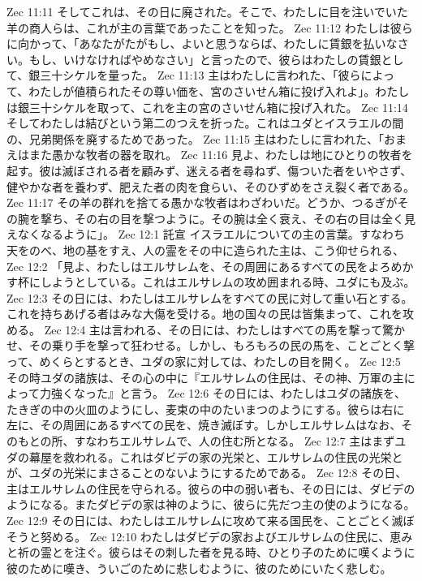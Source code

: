 Zec 11:11  そしてこれは、その日に廃された。そこで、わたしに目を注いでいた羊の商人らは、これが主の言葉であったことを知った。
Zec 11:12  わたしは彼らに向かって、「あなたがたがもし、よいと思うならば、わたしに賃銀を払いなさい。もし、いけなければやめなさい」と言ったので、彼らはわたしの賃銀として、銀三十シケルを量った。
Zec 11:13  主はわたしに言われた、「彼らによって、わたしが値積られたその尊い価を、宮のさいせん箱に投げ入れよ」。わたしは銀三十シケルを取って、これを主の宮のさいせん箱に投げ入れた。
Zec 11:14  そしてわたしは結びという第二のつえを折った。これはユダとイスラエルの間の、兄弟関係を廃するためであった。
Zec 11:15  主はわたしに言われた、「おまえはまた愚かな牧者の器を取れ。
Zec 11:16  見よ、わたしは地にひとりの牧者を起す。彼は滅ぼされる者を顧みず、迷える者を尋ねず、傷ついた者をいやさず、健やかな者を養わず、肥えた者の肉を食らい、そのひずめをさえ裂く者である。
Zec 11:17  その羊の群れを捨てる愚かな牧者はわざわいだ。どうか、つるぎがその腕を撃ち、その右の目を撃つように。その腕は全く衰え、その右の目は全く見えなくなるように」。
Zec 12:1  託宣 イスラエルについての主の言葉。すなわち天をのべ、地の基をすえ、人の霊をその中に造られた主は、こう仰せられる、
Zec 12:2  「見よ、わたしはエルサレムを、その周囲にあるすべての民をよろめかす杯にしようとしている。これはエルサレムの攻め囲まれる時、ユダにも及ぶ。
Zec 12:3  その日には、わたしはエルサレムをすべての民に対して重い石とする。これを持ちあげる者はみな大傷を受ける。地の国々の民は皆集まって、これを攻める。
Zec 12:4  主は言われる、その日には、わたしはすべての馬を撃って驚かせ、その乗り手を撃って狂わせる。しかし、もろもろの民の馬を、ことごとく撃って、めくらとするとき、ユダの家に対しては、わたしの目を開く。
Zec 12:5  その時ユダの諸族は、その心の中に『エルサレムの住民は、その神、万軍の主によって力強くなった』と言う。
Zec 12:6  その日には、わたしはユダの諸族を、たきぎの中の火皿のようにし、麦束の中のたいまつのようにする。彼らは右に左に、その周囲にあるすべての民を、焼き滅ぼす。しかしエルサレムはなお、そのもとの所、すなわちエルサレムで、人の住む所となる。
Zec 12:7  主はまずユダの幕屋を救われる。これはダビデの家の光栄と、エルサレムの住民の光栄とが、ユダの光栄にまさることのないようにするためである。
Zec 12:8  その日、主はエルサレムの住民を守られる。彼らの中の弱い者も、その日には、ダビデのようになる。またダビデの家は神のように、彼らに先だつ主の使のようになる。
Zec 12:9  その日には、わたしはエルサレムに攻めて来る国民を、ことごとく滅ぼそうと努める。
Zec 12:10  わたしはダビデの家およびエルサレムの住民に、恵みと祈の霊とを注ぐ。彼らはその刺した者を見る時、ひとり子のために嘆くように彼のために嘆き、ういごのために悲しむように、彼のためにいたく悲しむ。
